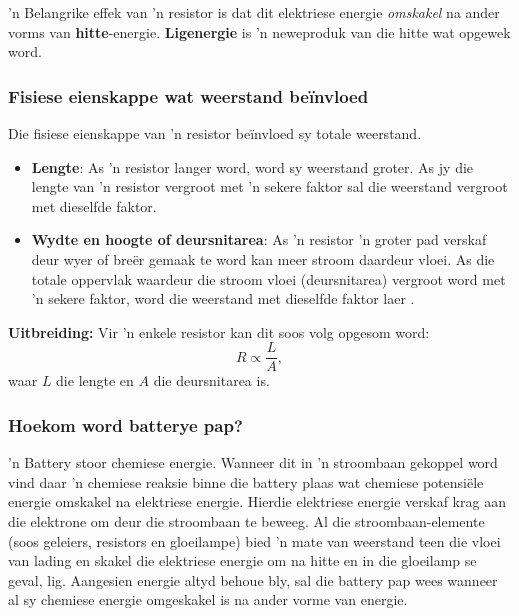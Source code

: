  'n Belangrike effek van 'n resistor is dat dit elektriese energie
\textit{omskakel} na ander vorms van \textbf{hitte}-energie.
\textbf{Ligenergie} is 'n neweproduk van die hitte wat opgewek word.


\subsubsection{Fisiese eienskappe wat weerstand be\"invloed}

Die fisiese eienskappe van 'n resistor be\"invloed sy totale weerstand.
\begin{itemize}
 \item \textbf{Lengte}: As 'n resistor langer word, word sy weerstand groter.
As jy die lengte van 'n resistor vergroot met 'n sekere faktor sal die
weerstand vergroot met dieselfde faktor.
\item \textbf{Wydte en hoogte of deursnitarea}: As 'n resistor 'n groter pad
verskaf deur wyer of bre\"er gemaak te word kan meer stroom daardeur vloei. As
die totale oppervlak waardeur die stroom vloei (deursnitarea) vergroot word
met 'n sekere faktor, word die weerstand met dieselfde faktor laer .
\end{itemize}
\textbf{Uitbreiding:} Vir 'n enkele resistor kan dit soos volg opgesom word:
\begin{equation*}
 R\propto\frac{L}{A},
\end{equation*} waar $L$ die lengte en $A$ die deursnitarea is.

\subsubsection*{Hoekom word batterye pap?}
 'n Battery stoor chemiese energie. Wanneer dit in 'n stroombaan gekoppel word
vind daar 'n chemiese reaksie binne die battery plaas wat chemiese
potensi\"ele energie omskakel na elektriese energie. Hierdie elektriese energie
verskaf krag aan die elektrone om deur die stroombaan te beweeg. Al die
stroombaan-elemente (soos geleiers, resistors en gloeilampe) bied 'n mate van
weerstand teen die vloei van lading en skakel die elektriese energie om na
hitte en in die gloeilamp se geval, lig.
Aangesien energie altyd behoue bly, sal die battery pap wees wanneer al sy
chemiese energie omgeskakel is na ander vorme van energie.

